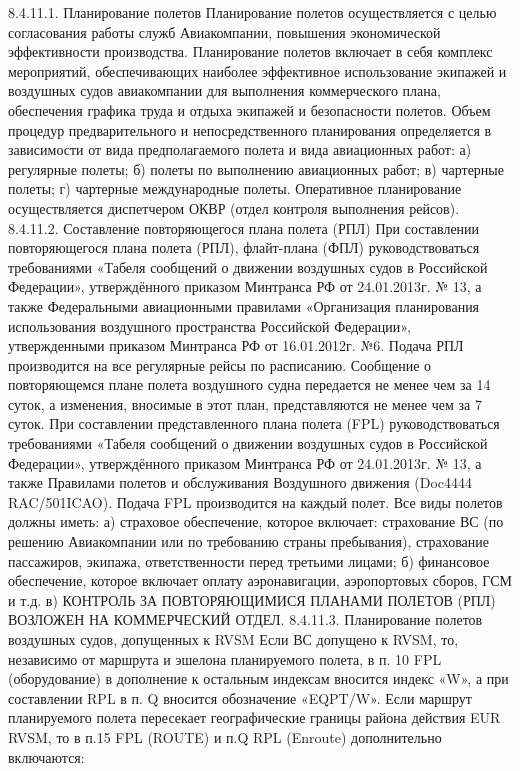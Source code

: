 8.4.11.1. Планирование полетов
Планирование полетов осуществляется с целью согласования работы служб Авиакомпании, повышения экономической эффективности производства.
Планирование полетов включает в себя комплекс мероприятий, обеспечивающих наиболее эффективное использование экипажей и воздушных судов авиакомпании для выполнения коммерческого плана, обеспечения графика труда и отдыха экипажей и безопасности полетов.
Объем процедур предварительного и непосредственного планирования определяется в зависимости от вида предполагаемого полета и вида авиационных работ:
а)	регулярные полеты;
б)	полеты по выполнению авиационных работ;
в)	чартерные полеты;
г)	чартерные международные полеты.
Оперативное планирование осуществляется диспетчером ОКВР (отдел контроля выполнения рейсов).
8.4.11.2. Составление повторяющегося плана полета (РПЛ)
При составлении повторяющегося плана полета (РПЛ), флайт-плана (ФПЛ) руководствоваться требованиями «Табеля сообщений о движении воздушных судов в Российской Федерации», утверждённого приказом Минтранса РФ от 24.01.2013г. № 13, а также Федеральными авиационными правилами «Организация планирования использования воздушного пространства Российской Федерации», утвержденными приказом Минтранса РФ от 16.01.2012г. №6.
Подача РПЛ производится на все регулярные рейсы по расписанию. Сообщение о повторяющемся плане полета воздушного судна передается не менее чем за 14 суток, а изменения, вносимые в этот план, представляются не менее чем за 7 суток.
При составлении представленного плана полета (FPL) руководствоваться требованиями «Табеля сообщений о движении воздушных судов в Российской Федерации», утверждённого приказом Минтранса 
РФ от 24.01.2013г. № 13, а также Правилами полетов и обслуживания Воздушного движения (Doc4444 RAC/501ICAO). Подача FPL производится на каждый полет.
Все виды полетов должны иметь:
а)	страховое обеспечение, которое включает: страхование ВС (по решению Авиакомпании или по требованию страны пребывания), страхование пассажиров, экипажа, ответственности перед третьими лицами;
б)	финансовое обеспечение, которое включает оплату аэронавигации, аэропортовых сборов, ГСМ и т.д.
в)	КОНТРОЛЬ ЗА ПОВТОРЯЮЩИМИСЯ ПЛАНАМИ ПОЛЕТОВ (РПЛ) ВОЗЛОЖЕН НА КОММЕРЧЕСКИЙ ОТДЕЛ.
8.4.11.3. Планирование полетов воздушных судов, допущенных к RVSM
Если ВС допущено к RVSM, то, независимо от маршрута и эшелона планируемого полета, в п. 10 FPL (оборудование) в дополнение к остальным индексам вносится индекс «W», а при составлении RPL в п. Q вносится обозначение «EQPT/W».
Если маршрут планируемого полета пересекает географические границы района действия EUR RVSM, то в п.15 FPL (ROUTE) и п.Q RPL (Enroute) дополнительно включаются:
